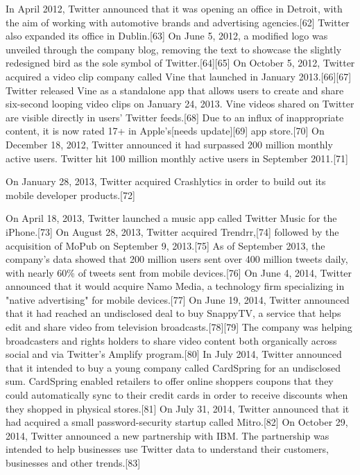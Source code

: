 \documentclass[12pt]{article}
\begin{document}
In April 2012, Twitter announced that it was opening an office in Detroit, with the aim of working with automotive brands and advertising agencies.[62] Twitter also expanded its office in Dublin.[63] On June 5, 2012, a modified logo was unveiled through the company blog, removing the text to showcase the slightly redesigned bird as the sole symbol of Twitter.[64][65] On October 5, 2012, Twitter acquired a video clip company called Vine that launched in January 2013.[66][67] Twitter released Vine as a standalone app that allows users to create and share six-second looping video clips on January 24, 2013. Vine videos shared on Twitter are visible directly in users' Twitter feeds.[68] Due to an influx of inappropriate content, it is now rated 17+ in Apple's[needs update][69] app store.[70] On December 18, 2012, Twitter announced it had surpassed 200 million monthly active users. Twitter hit 100 million monthly active users in September 2011.[71]

On January 28, 2013, Twitter acquired Crashlytics in order to build out its mobile developer products.[72]

On April 18, 2013, Twitter launched a music app called Twitter Music for the iPhone.[73] On August 28, 2013, Twitter acquired Trendrr,[74] followed by the acquisition of MoPub on September 9, 2013.[75] As of September 2013, the company's data showed that 200 million users sent over 400 million tweets daily, with nearly 60\% of tweets sent from mobile devices.[76] On June 4, 2014, Twitter announced that it would acquire Namo Media, a technology firm specializing in "native advertising" for mobile devices.[77] On June 19, 2014, Twitter announced that it had reached an undisclosed deal to buy SnappyTV, a service that helps edit and share video from television broadcasts.[78][79] The company was helping broadcasters and rights holders to share video content both organically across social and via Twitter's Amplify program.[80] In July 2014, Twitter announced that it intended to buy a young company called CardSpring for an undisclosed sum. CardSpring enabled retailers to offer online shoppers coupons that they could automatically sync to their credit cards in order to receive discounts when they shopped in physical stores.[81] On July 31, 2014, Twitter announced that it had acquired a small password-security startup called Mitro.[82] On October 29, 2014, Twitter announced a new partnership with IBM. The partnership was intended to help businesses use Twitter data to understand their customers, businesses and other trends.[83] 
\end{document}
